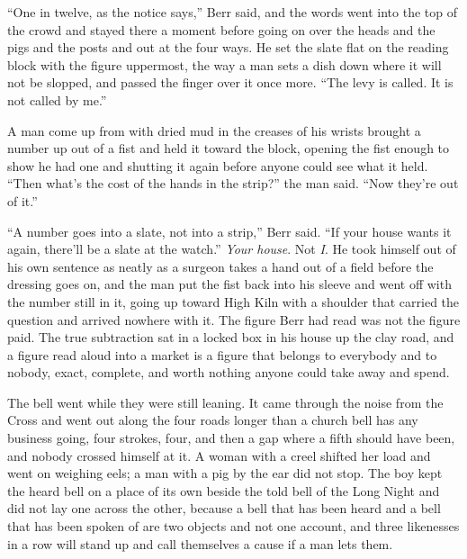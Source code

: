 “One in twelve, as the notice says,” Berr said, and the words went into the top of the crowd and stayed there a moment before going on over the heads and the pigs and the posts and out at the four ways. He set the slate flat on the reading block with the figure uppermost, the way a man sets a dish down where it will not be slopped, and passed the finger over it once more. “The levy is called. It is not called by me.”

A man come up from  with dried mud in the creases of his wrists brought a number up out of a fist and held it toward the block, opening the fist enough to show he had one and shutting it again before anyone could see what it held. “Then what's the cost of the hands in the strip?” the man said. “Now they're out of it.”

“A number goes into a slate, not into a strip,” Berr said. “If your house wants it again, there'll be a slate at the watch.” \emph{Your house}. Not \emph{I}. He took himself out of his own sentence as neatly as a surgeon takes a hand out of a field before the dressing goes on, and the man put the fist back into his sleeve and went off with the number still in it, going up toward High Kiln with a shoulder that carried the question and arrived nowhere with it. The figure Berr had read was not the figure paid. The true subtraction sat in a locked box in his house up the clay road, and a figure read aloud into a market is a figure that belongs to everybody and to nobody, exact, complete, and worth nothing anyone could take away and spend.

The bell went while they were still leaning. It came through the noise from the Cross and went out along the four roads longer than a church bell has any business going, four strokes, four, and then a gap where a fifth should have been, and nobody crossed himself at it. A woman with a creel shifted her load and went on weighing eels; a man with a pig by the ear did not stop. The boy kept the heard bell on a place of its own beside the told bell of the Long Night and did not lay one across the other, because a bell that has been heard and a bell that has been spoken of are two objects and not one account, and three likenesses in a row will stand up and call themselves a cause if a man lets them.

